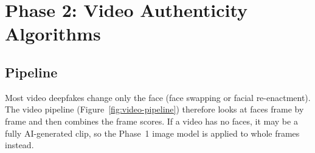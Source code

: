 \documentclass[11pt,a4paper]{article}
\begin{document}
\section{Phase 2: Video Authenticity Algorithms}
\label{sec:video}

\subsection{Pipeline}
Most video deepfakes change only the face (face swapping or facial re-enactment). The video
pipeline (Figure~\ref{fig:video-pipeline}) therefore looks at faces frame by frame and then
combines the frame scores. If a video has no faces, it may be a fully AI-generated clip, so the
Phase~1 image model is applied to whole frames instead.
\end{document}

